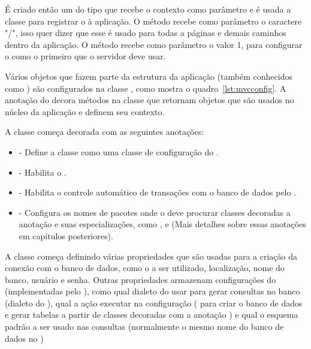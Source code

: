 É criado então um  do tipo  que recebe o contexto como parâmetro e é usada a classe  para registrar o  à aplicação. O método  recebe como parâmetro o caractere "/", isso quer dizer que esse  é usado para todas a páginas  e demais caminhos dentro da aplicação. O método  recebe como parâmetro o valor 1, para configurar o  como o primeiro que o servidor deve usar.


Vários objetos que fazem parte da estrutura da aplicação (também conhecidos como ) são configurados na classe , como mostra o quadro~\ref{lst:mvcconfig}. A anotação  do  decora métodos na classe  que retornam objetos que são usados no núcleo da aplicação e definem seu contexto.

A classe  começa decorada com as seguintes anotações:

\begin{itemize}
  \item {} - Define a classe como uma classe de configuração do .
  \item {} - Habilita o .
  \item {} - Habilita o controle automático de transações com o banco de dados pelo .
  \item {} - Configura os nomes de pacotes onde o  deve procurar classes decoradas a anotação  e suas especializações, como ,  e  (Mais detalhes sobre essas anotações em capítulos posteriores).  
\end{itemize}


A classe começa definindo várias propriedades que são usadas para a criação da conexão com o banco de dados, como o  a ser utilizado, localização, nome do banco, usuário e senha. Outras propriedades armazenam configurações do  (implementadas pelo ), como qual dialeto do  usar para gerar consultas no banco (dialeto do ), qual a ação executar na configuração  ( para criar o banco de dados e gerar tabelas a partir de classes decoradas com a anotação ) e qual o esquema padrão a ser usado nas consultas (normalmente o mesmo nome do banco de dados no )

